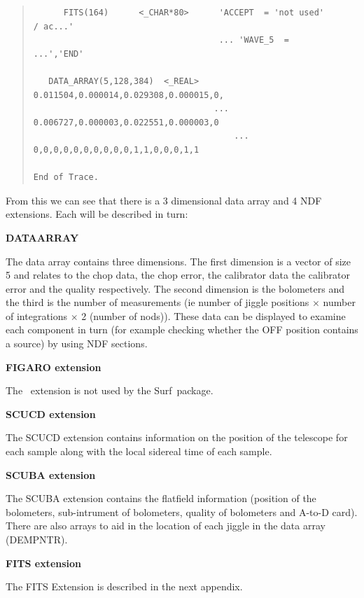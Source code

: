 \documentclass[twoside,11pt]{article}
\newcommand{\scusoft}          {{\sc Surf}}
\newcommand{\Figaro}{\xref{{\sc{Figaro}}}{sun86}{}}
\newenvironment{myquote}{\begin{quote}\begin{small}}{\end{small}\end{quote}}
\newcommand{\xref}[3]{#1}
\renewcommand{\_}{\texttt{\symbol{95}}}
\begin{document}
\begin{myquote}
\begin{verbatim}
      FITS(164)      <_CHAR*80>      'ACCEPT  = 'not used'           / ac...'
                                     ... 'WAVE_5  =                 ...','END'
 
   DATA_ARRAY(5,128,384)  <_REAL>   0.011504,0.000014,0.029308,0.000015,0,
                                    ... 0.006727,0.000003,0.022551,0.000003,0
                                        ... 0,0,0,0,0,0,0,0,0,0,1,1,0,0,0,1,1

End of Trace.
\end{verbatim}
\end{myquote}

From this we can see that there is a 3 dimensional data array and 4 NDF
extensions. Each will be described in turn:

\begin{description}
\item {\bf DATA\_ARRAY}

The data array contains three dimensions. The first dimension is a vector of
size 5 and relates to the chop data, the chop error, the calibrator data the
calibrator error and the quality respectively. The second dimension is the
bolometers and the third is the number of measurements (ie number of jiggle
positions $\times$ number of integrations $\times$ 2 (number of nods)). These
data can be displayed to examine each component in turn (for example checking
whether the OFF position contains a source) by using NDF sections.

\item {\bf FIGARO extension}

The \Figaro\ extension is not used by the \scusoft\ package.

\item {\bf SCUCD extension}

The SCUCD extension contains information on the position of the telescope for
each sample along with the local sidereal time of each sample.

\item {\bf SCUBA extension}

The SCUBA extension contains the flatfield information (position of the
bolometers, sub-intrument of bolometers, quality of bolometers and A-to-D
card). There are also arrays to aid in the location of each jiggle in the data
array (DEM\_PNTR).

\item {\bf FITS extension}

The FITS Extension is described in the next appendix.

\end{description}
\end{document}
